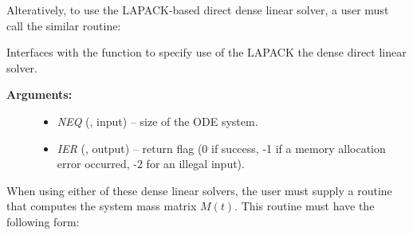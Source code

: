 \documentclass[letterpaper,10pt,english]{sphinxmanual}
\begin{document}
Alteratively, to use the LAPACK-based direct dense linear solver, a
user must call the similar {\hyperref[f_interface/Usage:f/_/FARKMASSLAPACKDENSE]{\emph{}}} routine:

\begin{fulllineitems}
\label{f_interface/Usage:f/_/FARKMASSLAPACKDENSE}
Interfaces with the {\hyperref[c_interface/User_callable:c.ARKMassLapackDense]{\emph{}}} function
to specify use of the LAPACK the dense direct linear solver.
\begin{description}
\item[{\textbf{Arguments:}}] \leavevmode\begin{itemize}
\item {} 
\emph{NEQ} (, input) -- size of the ODE system.

\item {} 
\emph{IER} (, output) -- return flag (0 if success, -1 if a memory allocation
error occurred, -2 for an illegal input).

\end{itemize}

\end{description}

\end{fulllineitems}


When using either of these dense linear solvers, the user must supply
a routine that computes the system mass matrix \(M(t)\).  This
routine must have the following form:
\end{document}
